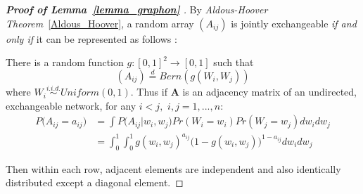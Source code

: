 \documentclass[12pt]{article}
\theoremstyle{definition}
\begin{document}
\begin{proof}[\textbf{Proof of Lemma~\ref{lemma_graphon} }] 
	By \textit{Aldous-Hoover Theorem}~\ref{Aldous_Hoover}, a random array $(A_{ij})$ is jointly exchangeable \textit{if and only if} it can be represented as follows : 
		
	There is a random function $g : [0,1]^2 \rightarrow [0,1]$ such that 
\begin{equation}
(A_{ij})  \stackrel{d}{=} Bern( g(W_{i}, W_{j}))
\end{equation}
where $W_{i} \overset{i.i.d.}{\sim} Uniform(0,1)$. Thus if $\mathbf{A}$ is an adjacency matrix of an undirected, exchangeable network, for any $i < j,$ $i,j = 1,... , n$:
\begin{equation}
\begin{split}
	P \big(  A_{ij} = a_{ij} \big) & = \int P \big( A_{ij} \big| w_{i}, w_{j} \big) Pr(W_{i} = w_{i}) Pr(W_{j} = w_{j}) dw_{i} dw_{j} \\ & = \int_{0}^{1} \int_{0}^{1} g( w_{i},  w_{j})^{a_{ij}} \big( 1- g( w_{i},  w_{j}) \big)^{1-a_{ij}} dw_{i} dw_{j} 
\end{split}
\end{equation}
		
Then within each row, adjacent elements are independent and also identically distributed except a diagonal element.

\end{proof}
	
\end{document}
